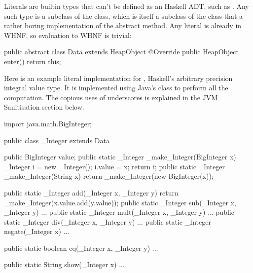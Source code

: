 \documentclass[dissertation.tex]{subfiles}
\begin{document}
{{{{                Literals are builtin types that can't be defined as an Haskell ADT, such as . Any such type
                is a subclass of the  class, which is itself a subclass of the  class that a
                rather boring implementation of the abstract  method. Any literal is already in WHNF, so
                evaluation to WHNF is trivial:

                \begin{javafigure}
                public abstract class Data extends HeapObject {
                    @Override
                    public HeapObject enter() {
                        return this;
                    }
                }
                \end{javafigure}

                Here is an example literal implementation for , Haskell's arbitrary precision integral
                value type. It is implemented using Java's  class to perform all the computation. The
                copious uses of underscores is explained in the JVM Sanitisation section below.

                \begin{javafigure}
                import java.math.BigInteger;

                public class _Integer extends Data {
                    public BigInteger value;
                    public static _Integer _make_Integer(BigInteger x) {
                        _Integer i = new _Integer();
                        i.value = x;
                        return i;
                    }
                    public static _Integer _make_Integer(String x) {
                        return _make_Integer(new BigInteger(x));
                    }

                    public static _Integer add(_Integer x, _Integer y) {
                        return _make_Integer(x.value.add(y.value));
                    }
                    public static _Integer sub(_Integer x, _Integer y) { ... }
                    public static _Integer mult(_Integer x, _Integer y) { ... }
                    public static _Integer div(_Integer x, _Integer y) { ... }
                    public static _Integer negate(_Integer x) { ... }

                    public static boolean eq(_Integer x, _Integer y) { ... }

                    public static String show(_Integer x) { ... }
                }
                \end{javafigure}

}}}}
\end{document}
